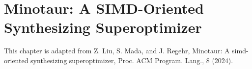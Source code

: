 \chapter{Minotaur: A SIMD-Oriented Synthesizing Superoptimizer}
\label{chap:minotaur}

This chapter is adapted from Z. Liu, S. Mada, and J. Regehr, Minotaur:
A simd-oriented synthesizing superoptimizer, Proc. ACM Program.
Lang., 8 (2024).







